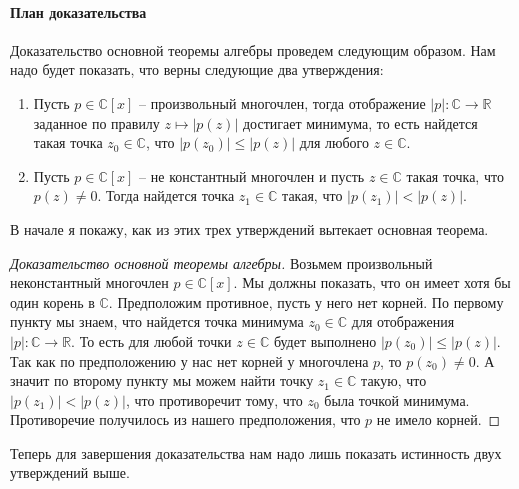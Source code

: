 \paragraph{План доказательства}

Доказательство основной теоремы алгебры проведем следующим образом. Нам надо будет показать, что верны следующие два утверждения:
\begin{enumerate}
\item Пусть $p\in \mathbb C[x]$ -- произвольный многочлен, тогда отображение $|p|\colon \mathbb C\to \mathbb R$ заданное по правилу $z\mapsto |p(z)|$ достигает минимума, то есть найдется такая точка $z_0\in\mathbb C$, что $|p(z_0)|\leqslant |p(z)|$ для любого $z\in \mathbb C$.

\item Пусть $p\in \mathbb C[x]$ -- не константный многочлен и пусть $z\in \mathbb C$ такая точка, что $p(z) \neq 0$. Тогда найдется точка $z_1\in \mathbb C$ такая, что $|p(z_1)| < |p(z)|$.
\end{enumerate}

В начале я покажу, как из этих трех утверждений вытекает основная теорема.

\begin{proof}[Доказательство основной теоремы алгебры]
Возьмем произвольный неконстантный многочлен $p\in\mathbb C[x]$. Мы должны показать, что он имеет хотя бы один корень в $\mathbb C$. Предположим противное, пусть у него нет корней. По первому пункту мы знаем, что найдется точка минимума $z_0\in\mathbb C$ для отображения $|p|\colon \mathbb C\to \mathbb R$. То есть для любой точки $z\in\mathbb C$ будет выполнено $|p(z_0)|\leqslant |p(z)|$. Так как по предположению у нас нет корней у многочлена $p$, то $p(z_0) \neq 0$. А значит по второму пункту мы можем найти точку $z_1\in\mathbb C$ такую, что $|p(z_1)|< |p(z)|$, что противоречит тому, что $z_0$ была точкой минимума. Противоречие получилось из нашего предположения, что $p$ не имело корней.
\end{proof}

Теперь для завершения доказательства нам надо лишь показать истинность двух утверждений выше.



